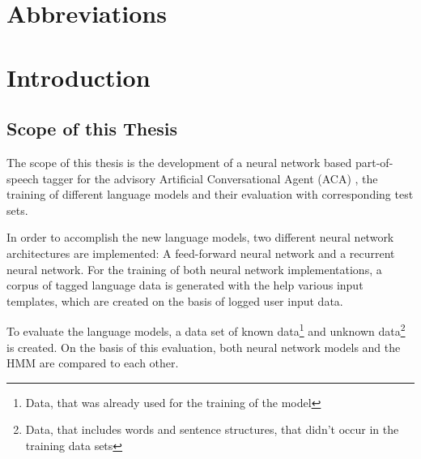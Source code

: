\listoftables

\chapter*{Abbreviations}\label{s.abbr}
\begin{acronym}[----------------]
\end{acronym}

\chapter{Introduction}\label{c.introduction}


\section{Scope of this Thesis}\label{c.introduction.scope}
The scope of this thesis is the development of a neural network based part-of-speech tagger for the advisory Artificial Conversational Agent (ACA) \Alex, the training of different language models and their evaluation with corresponding test sets.

In order to accomplish the new language models, two different neural network architectures are implemented: A feed-forward neural network and a recurrent neural network. For the training of both neural network implementations, a corpus of tagged language data is generated with the help various input templates, which are created on the basis of logged user input data.

To evaluate the language models, a data set of known data\footnote{Data, that was already used for the training of the model} and unknown data\footnote{Data, that includes words and sentence structures, that didn't occur in the training data sets} is created. On the basis of this evaluation, both neural network models and the HMM are compared to each other.

